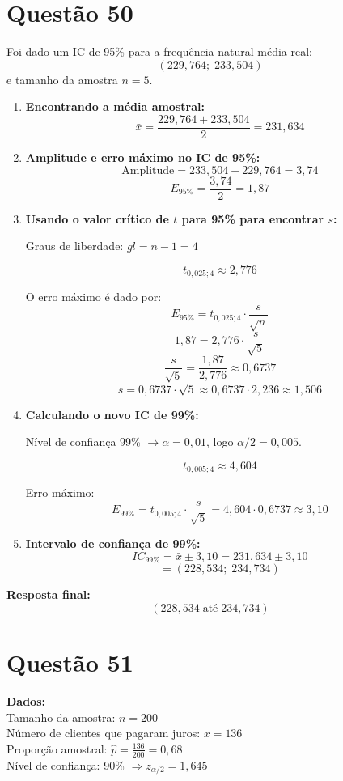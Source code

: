 \documentclass[12pt]{article}
\newcommand{\quest}[1]{\section*{Questão #1}} %
\begin{document}
\quest{50}

Foi dado um IC de 95\% para a frequência natural média real:
\[
(229,764 ; \; 233,504)
\]
e tamanho da amostra $n=5$.

\begin{enumerate}
    \item \textbf{Encontrando a média amostral:}
    \[
    \bar{x} = \frac{229,764 + 233,504}{2} = 231,634
    \]
    
    \item \textbf{Amplitude e erro máximo no IC de 95\%:}
    \[
    \text{Amplitude} = 233,504 - 229,764 = 3,74
    \]
    \[
    E_{95\%} = \frac{3,74}{2} = 1,87
    \]
    
    \item \textbf{Usando o valor crítico de $t$ para 95\% para encontrar $s$:}
    
    Graus de liberdade: $gl = n - 1 = 4$
    
    \[
    t_{0,025;4} \approx 2,776
    \]
    
    O erro máximo é dado por:
    \[
    E_{95\%} = t_{0,025;4} \cdot \frac{s}{\sqrt{n}}
    \]
    \[
    1,87 = 2,776 \cdot \frac{s}{\sqrt{5}}
    \]
    \[
    \frac{s}{\sqrt{5}} = \frac{1,87}{2,776} \approx 0,6737
    \]
    \[
    s = 0,6737 \cdot \sqrt{5} \approx 0,6737 \cdot 2,236 \approx 1,506
    \]
    
    \item \textbf{Calculando o novo IC de 99\%:}
    
    Nível de confiança 99\% $\rightarrow \alpha=0,01$, logo $\alpha/2=0,005$.
    
    \[
    t_{0,005;4} \approx 4,604
    \]
    
    Erro máximo:
    \[
    E_{99\%} = t_{0,005;4} \cdot \frac{s}{\sqrt{5}} = 4,604 \cdot 0,6737 \approx 3,10
    \]
    
    \item \textbf{Intervalo de confiança de 99\%:}
    \[
    IC_{99\%} = \bar{x} \pm 3,10 = 231,634 \pm 3,10
    \]
    \[
    = (228,534 ; \; 234,734)
    \]
\end{enumerate}

\textbf{Resposta final:}
\[
\boxed{(228,534 \;\text{até}\; 234,734)}
\]

\quest{51}

\textbf{Dados:}\\
Tamanho da amostra: $n = 200$\\
N\'umero de clientes que pagaram juros: $x = 136$\\
Propor\c{c}\~ao amostral: $\hat{p} = \frac{136}{200} = 0{,}68$\\
N\'ivel de confian\c{c}a: 90\% $\Rightarrow z_{\alpha/2} = 1{,}645$
\end{document}
